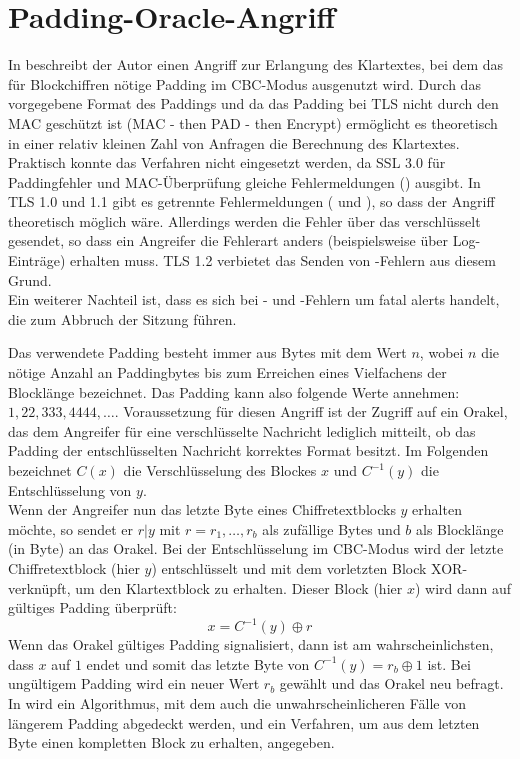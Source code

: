 \section{Padding-Oracle-Angriff}

In \cite{vaudenay02} beschreibt der Autor einen Angriff zur Erlangung des Klartextes, bei dem das für Blockchiffren nötige Padding im CBC-Modus ausgenutzt wird. Durch das vorgegebene Format des Paddings und da das Padding bei TLS nicht durch den MAC geschützt ist (MAC - then PAD - then Encrypt) ermöglicht es theoretisch in einer relativ kleinen Zahl von Anfragen die Berechnung des Klartextes.\\
Praktisch konnte das Verfahren nicht eingesetzt werden, da SSL 3.0 für Paddingfehler und MAC-Überprüfung gleiche Fehlermeldungen (\badrecordmac{}) ausgibt. In TLS 1.0 und 1.1 gibt es getrennte Fehlermeldungen (\badrecordmac{} und \decryptionfailed{}), so dass der Angriff theoretisch möglich wäre. Allerdings werden die Fehler über das \alertprotocol{} verschlüsselt gesendet, so dass ein Angreifer die Fehlerart anders (beispielsweise über Log-Einträge) erhalten muss. TLS 1.2 verbietet das Senden von \decryptionfailed{}-Fehlern aus diesem Grund.\\
Ein weiterer Nachteil ist, dass es sich bei \badrecordmac{}- und \decryptionfailed{}-Fehlern um fatal alerts handelt, die zum Abbruch der Sitzung führen.

Das verwendete Padding besteht immer aus Bytes mit dem Wert \(n\), wobei \(n\) die nötige Anzahl an Paddingbytes bis zum Erreichen eines Vielfachens der Blocklänge bezeichnet. Das Padding kann also folgende Werte annehmen: \(1, 22, 333, 4444, \dots\). Voraussetzung für diesen Angriff ist der Zugriff auf ein Orakel, das dem Angreifer für eine verschlüsselte Nachricht lediglich mitteilt, ob das Padding der entschlüsselten Nachricht korrektes Format besitzt. Im Folgenden bezeichnet \(C(x)\) die Verschlüsselung des Blockes \(x\) und \(C^{-1}(y)\) die Entschlüsselung von \(y\).\\
Wenn der Angreifer nun das letzte Byte eines Chiffretextblocks \(y\) erhalten möchte, so sendet er \(r | y\) mit \(r = r_1,  \dots , r_b\) als zufällige Bytes und \(b\) als Blocklänge (in Byte) an das Orakel. Bei der Entschlüsselung im CBC-Modus wird der letzte Chiffretextblock (hier \(y\)) entschlüsselt und mit dem vorletzten Block XOR-verknüpft, um den Klartextblock zu erhalten. Dieser Block (hier \(x\)) wird dann auf gültiges Padding überprüft:
\[x=C^{-1}(y) \oplus r\]
Wenn das Orakel gültiges Padding signalisiert, dann ist am wahrscheinlichsten, dass \(x\) auf \(1\) endet und somit das letzte Byte von \(C^{-1}(y)= r_b \oplus 1\) ist. Bei ungültigem Padding wird ein neuer Wert \(r_b\) gewählt und das Orakel neu befragt.\\
In \cite{vaudenay02} wird ein Algorithmus, mit dem auch die unwahrscheinlicheren Fälle von längerem Padding abgedeckt werden, und ein Verfahren, um aus dem letzten Byte einen kompletten Block zu erhalten, angegeben. 

